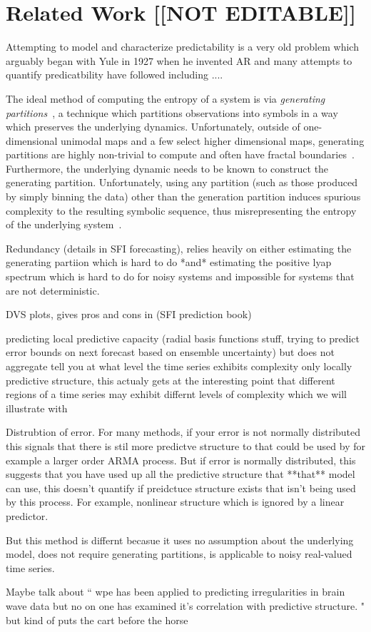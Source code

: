 \section{Related Work [[NOT EDITABLE]]}\label{sec:related}

Attempting to model and characterize predictability is a very old problem which arguably began with Yule in 1927 when he invented AR and many attempts to quantify predicatbility have followed including ....

The ideal method of computing the entropy of a system is via \emph{generating partitions}~\cite{lind95}, a technique which partitions observations into symbols in a way which preserves the underlying dynamics. Unfortunately, outside of one-dimensional unimodal maps and a few select higher dimensional maps, generating partitions are highly non-trivial to compute and often have fractal boundaries~\cite{eisele1999}. Furthermore, the underlying dynamic needs to be known to construct the generating partition. Unfortunately, using any partition (such as those produced by simply binning the data) other than the generation partition induces spurious complexity to the resulting symbolic sequence, thus misrepresenting the entropy of the underlying system~\cite{bollt2001}.


Redundancy (details in SFI forecasting), relies heavily on either estimating the generating partiion which is hard to do *and* estimating the positive lyap spectrum which is hard to do for noisy systems and impossible for systems that are not deterministic.

DVS plots, gives pros and cons in (SFI prediction book)

predicting local predictive capacity (radial basis functions stuff, trying to predict error bounds on next forecast based on ensemble uncertainty) but does not aggregate tell you at what level the time series exhibits complexity only locally predictive structure, this actualy gets at the interesting point that different regions of a time series may exhibit differnt levels of complexity which we will illustrate with \svd

Distrubtion of error. For many methods, if your error is not normally distributed this signals that there is stil more predictve structure to that could be used by for example a larger order ARMA process. But if error is normally distributed, this suggests that you have used up all the predictive structure that **that** model can use, this doesn't quantify if preidctuce structure exists that isn't being used by this process. For example, nonlinear structure which is ignored by a linear predictor.


But this method is differnt becasue it uses no assumption about the underlying model, does not require generating partitions, is applicable to noisy real-valued time series.


Maybe talk about ``
wpe has been applied to predicting irregularities in brain wave data but no on one has examined it's correlation with predictive structure. "
but kind of puts the cart before the horse


